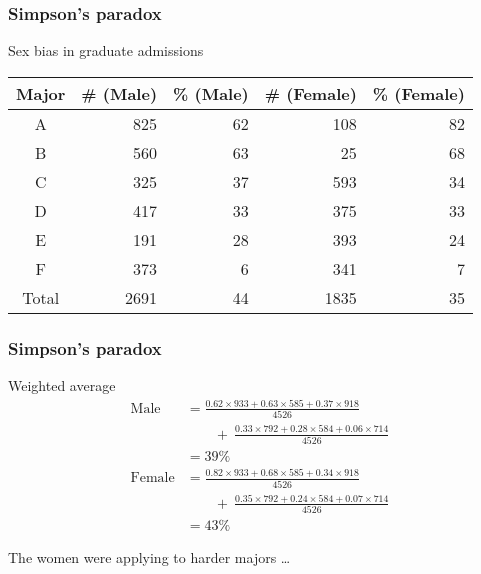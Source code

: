 \documentclass[handout]{beamer}
\begin{document}

   \begin{frame} \frametitle{Simpson's paradox}

   \begin{block}
   {Sex bias in graduate admissions}
   {\small
   \begin{tabular}{c|rr|rr}
   Major & \# (Male) & \% (Male) & \# (Female) & \% (Female) \\ \hline
   A & 825 & 62 & 108 & 82 \\
   B & 560 & 63 & 25 & 68 \\
   C & 325 & 37 & 593 & 34 \\
   D & 417 & 33 & 375  & 33 \\
   E & 191 & 28 & 393 & 24 \\
   F & 373 & 6 & 341 & 7 \\ \hline
   Total & 2691 & 44 & 1835 & 35
   \end{tabular}
   }
   \end{block}
   \end{frame}


   \begin{frame} \frametitle{Simpson's paradox}

   \begin{block}
   {Weighted average}
   {\small
   $$
   \begin{aligned}
   \text{Male} &= \frac{0.62 \times 933 + 0.63 \times 585 + 0.37 \times 918}{4526} \\
   & \qquad  +  \ \frac{0.33 \times 792 + 0.28 \times 584 + 0.06 \times 714}{4526} \\
   &= 39 \% \\
   \text{Female} &= \frac{0.82 \times 933 + 0.68 \times 585 + 0.34 \times 918}{4526} \\
   & \qquad + \  \frac{0.35 \times 792 + 0.24 \times 584 + 0.07 \times 714}{4526} \\
   &= 43 \%
   \end{aligned}
   $$
   }

   The women were applying to harder majors \dots

   \end{block}
   \end{frame}


   \begin{frame} 

   \end{frame}

   
\end{document}
